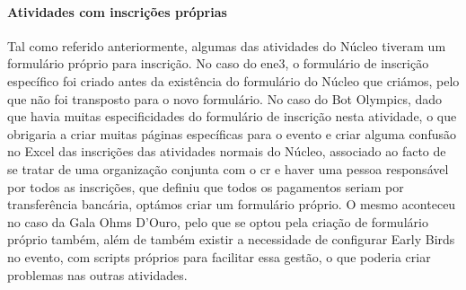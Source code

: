 \paragraph{Atividades com inscrições próprias}

Tal como referido anteriormente, algumas das atividades do Núcleo tiveram um formulário próprio para inscrição. No caso do \acrshort{ene3}, o formulário de inscrição específico foi criado antes da existência do formulário do Núcleo que criámos, pelo que não foi transposto para o novo formulário. No caso do Bot Olympics, dado que havia muitas especificidades do formulário de inscrição nesta atividade, o que obrigaria a criar muitas páginas específicas para o evento e criar alguma confusão no Excel das inscrições das atividades normais do Núcleo, associado ao facto de se tratar de uma organização conjunta com o \acrlong{cr} e haver uma pessoa responsável por todos as inscrições, que definiu que todos os pagamentos seriam por transferência bancária, optámos criar um formulário próprio. O mesmo aconteceu no caso da Gala Ohms D'Ouro, pelo que se optou pela criação de formulário próprio também, além de também existir a necessidade de configurar Early Birds no evento, com scripts próprios para facilitar essa gestão, o que poderia criar problemas nas outras atividades.